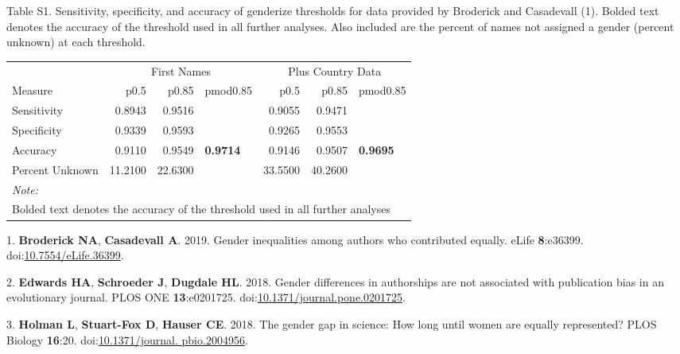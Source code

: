 \documentclass[11pt,]{article}
\begin{document}
\vspace{40mm}

Table S1. Sensitivity, specificity, and accuracy of genderize thresholds
for data provided by Broderick and Casadevall (1). Bolded text denotes
the accuracy of the threshold used in all further analyses. Also
included are the percent of names not assigned a gender (percent
unknown) at each threshold.

\begin{table}[H]
\centering
\begin{tabular}{l|r|r|l|r|r|l}
\hline
\multicolumn{1}{c|}{ } & \multicolumn{3}{c|}{First Names} & \multicolumn{3}{c}{Plus Country Data} \\
\cline{2-4} \cline{5-7}
Measure & p0.5 & p0.85 & pmod0.85 & p0.5 & p0.85 & pmod0.85\\
\hline
Sensitivity & 0.8943 & 0.9516 & \cellcolor{white}{0.971} & 0.9055 & 0.9471 & \cellcolor{white}{0.9669}\\
\hline
Specificity & 0.9339 & 0.9593 & \cellcolor{white}{0.972} & 0.9265 & 0.9553 & \cellcolor{white}{0.9727}\\
\hline
Accuracy & 0.9110 & 0.9549 & \textbf{0.9714} & 0.9146 & 0.9507 & \textbf{0.9695}\\
\hline
Percent Unknown & 11.2100 & 22.6300 & \cellcolor{white}{34.58} & 33.5500 & 40.2600 & \cellcolor{white}{58.72}\\
\hline
\multicolumn{7}{l}{\textit{Note: }}\\
\multicolumn{7}{l}{Bolded text denotes the accuracy of the threshold used in all further analyses}\\
\end{tabular}
\end{table}

\hypertarget{refs}{}
\hypertarget{ref-broderick_gender_2019}{}
1. \textbf{Broderick NA}, \textbf{Casadevall A}. 2019. Gender
inequalities among authors who contributed equally. eLife
\textbf{8}:e36399.
doi:\href{https://doi.org/10.7554/eLife.36399}{10.7554/eLife.36399}.

\hypertarget{ref-edwards_gender_2018}{}
2. \textbf{Edwards HA}, \textbf{Schroeder J}, \textbf{Dugdale HL}. 2018.
Gender differences in authorships are not associated with publication
bias in an evolutionary journal. PLOS ONE \textbf{13}:e0201725.
doi:\href{https://doi.org/10.1371/journal.pone.0201725}{10.1371/journal.pone.0201725}.

\hypertarget{ref-holman_gender_2018}{}
3. \textbf{Holman L}, \textbf{Stuart-Fox D}, \textbf{Hauser CE}. 2018.
The gender gap in science: How long until women are equally represented?
PLOS Biology \textbf{16}:20.
doi:\href{https://doi.org/10.1371/journal.\%20pbio.2004956}{10.1371/journal. pbio.2004956}.
\end{document}
